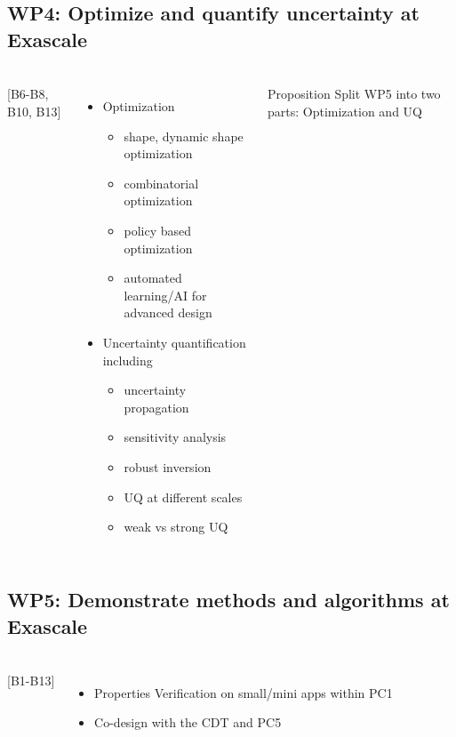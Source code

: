 \subsection{WP4: Optimize and quantify uncertainty at Exascale }
\begin{frame}
  \frametitle{\insertsectionhead}
  \framesubtitle{\insertsubsectionhead}
  \begin{columns}
    [B6-B8, B10, B13]
    \begin{itemize}
      \item Optimization 
      \begin{itemize}
        \item shape, dynamic shape optimization
        \item combinatorial optimization
        \item policy based optimization
        \item automated learning/AI for advanced design
      \end{itemize}
      \item Uncertainty quantification including 
      \begin{itemize}
        \item uncertainty propagation
        \item sensitivity analysis
        \item robust inversion
        \item UQ at different scales
        \item weak vs strong UQ
      \end{itemize}
    \end{itemize}
    \begin{alertblock}{Proposition}
      Split WP5 into two parts: Optimization and UQ
    \end{alertblock}
  \end{columns}
\end{frame}
\subsection{WP5: Demonstrate methods and algorithms at Exascale}
\begin{frame}
  \frametitle{\insertsectionhead}
  \framesubtitle{\insertsubsectionhead}

  \begin{columns}
    [B1-B13]
    \begin{itemize}
      \item Properties Verification on small/mini apps within PC1
      \item Co-design with the CDT and PC5
    \end{itemize}
  \end{columns}

\end{frame}
